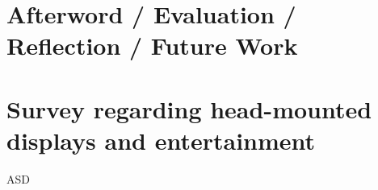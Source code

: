 \documentclass[a4paper,11pt,twoside]{report}
\begin{document}




\chapter{Afterword / Evaluation / Reflection / Future Work}


\clearpage





\appendix
\chapter{Survey regarding head-mounted displays and entertainment}
ASD
	
\end{document}
